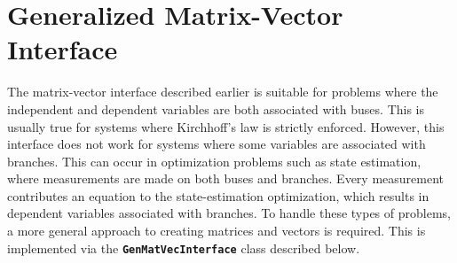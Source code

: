 \chapter{Generalized Matrix-Vector Interface}

The matrix-vector interface described earlier is suitable for problems where the
independent and dependent variables are both associated with buses. This is
usually true for systems where Kirchhoff's law is strictly enforced. However,
this interface does not work for systems where some variables are associated
with branches. This can occur in optimization problems such as state estimation,
where measurements are made on both buses and branches. Every measurement
contributes an equation to the state-estimation optimization, which results in
dependent variables associated with branches. To handle these types of problems,
a more general approach to creating matrices and vectors is required. This is
implemented via the \texttt{\textbf{GenMatVecInterface}} class described below.
